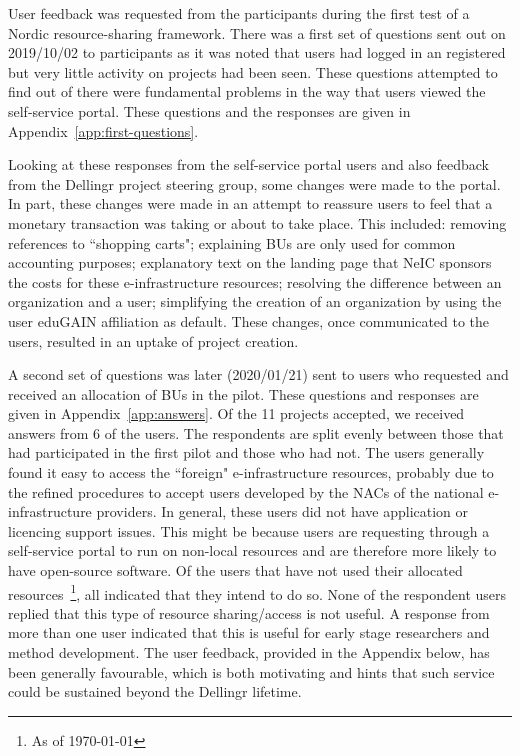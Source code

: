 \documentclass{article}
\newcommand{\dell}{Dellingr\xspace}
\newcommand{\einfra}{e-infrastructure\xspace}
\newcommand{\pilot}{first test of a Nordic resource-sharing framework\xspace}
\newcommand{\accepted}{11\xspace}
\begin{document}
User feedback was requested from the participants during the \pilot.
There was a first set of questions sent out on 2019/10/02 to participants as it was noted that users had logged in an registered but very little activity on projects had been seen.
These questions attempted to find out of there were fundamental problems in the way that users viewed the self-service portal.
These questions and the responses are given in Appendix~\ref{app:first-questions}.

Looking at these responses from the self-service portal users and also feedback from the \dell project steering group, some changes were made to the portal.
In part, these changes were made in an attempt to reassure users to feel that
a monetary transaction was taking or about to take place.
This included: removing references to ``shopping carts"; explaining BUs are only used for common accounting purposes; explanatory text on the landing page that NeIC sponsors the costs for these \einfra resources; resolving the difference between an organization and a user; simplifying the creation of an organization by using the user eduGAIN affiliation as default.
These changes, once communicated to the users, resulted in an uptake of project creation.

A second set of questions was later (2020/01/21) sent to users 
who requested and received an allocation of BUs in the pilot.
These questions and responses are given in Appendix~\ref{app:answers}.
Of the \accepted projects accepted, we received answers from 6 of the users.
The respondents are split evenly between those that had participated in the first pilot and those who had not.
The users generally found it easy to access the ``foreign" \einfra resources, probably due to the refined procedures to accept users developed by the NACs of the national \einfra providers.
In general, these users did not have application or licencing support issues.
This might be because users are requesting through a self-service portal to run on non-local resources and are therefore more likely to have open-source software.
Of the users that have not used their allocated resources~\footnote{As of \today}, all indicated that they intend to do so.
None of the respondent users replied that this type of resource sharing/access
is not useful.
A response from more than one user indicated that this is useful for early stage researchers and method development.
The user feedback, provided in the Appendix below, has been generally favourable, which is both motivating and hints that such service could be sustained beyond the \dell lifetime.
\end{document}
